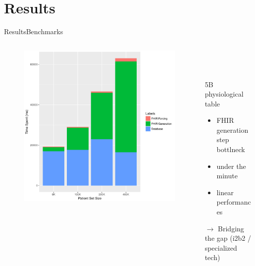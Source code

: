 \documentclass[10pt]{beamer}
\begin{document}
\section{Results}
\begin{frame}{Results}{Benchmarks}
 \begin{columns}[T,onlytextwidth]
        \begin{column}{.6\textwidth}
            \begin{onlyenv}
                \begin{minipage}{\textwidth}
                    \begin{figure}
\includegraphics[height=.7\textheight]{images/graph1.pdf}
                    \end{figure}
                \end{minipage}
            \end{onlyenv}
        \end{column}
        \begin{column}{.4\textwidth}
            \begin{onlyenv}
                \begin{minipage}{\textwidth}
			~\\
			~\\
			~\\
	5B physiological table
	\begin{itemize}
		\item FHIR generation step bottlneck
		\item under the minute
		\item linear performances
	\end{itemize}
			$\rightarrow$ Bridging the gap (i2b2 / specialized tech)
                \end{minipage}
            \end{onlyenv}
        \end{column}
    \end{columns} 

\end{frame}
\end{document}
